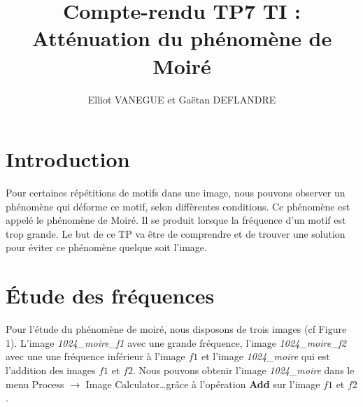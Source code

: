 \documentclass[a4paper,11pt]{article}
\title{Compte-rendu TP7 TI : Atténuation du phénomène de Moiré}
\author{Elliot VANEGUE et Gaëtan DEFLANDRE}
\begin{document}


  \maketitle
  
  \mbox{}
  \newpage
  \clearpage
  
  \section*{Introduction}
  Pour certaines répétitions de motifs dans une image, nous pouvons observer un phénomène qui déforme ce motif, selon diffèrentes conditions. 
  Ce phénomène est appelé le phénomène de Moiré. Il se produit lorsque la fréquence d’un motif est trop grande. Le but de ce TP va être de 
  comprendre et de trouver une solution pour éviter ce phénomène quelque soit l’image.\\
 
  \section{Étude des fréquences}
  Pour l’étude du phénomène de moiré, nous disposons de trois images (cf Figure 1). L’image \textit{1024\_moire\_f1} avec une grande fréquence, 
  l’image \textit{1024\_moire\_f2} avec une une fréquence inférieur à l’image $f1$ et l’image \textit{1024\_moire} qui est l’addition des images 
  $f1$ et $f2$. Nous pouvons obtenir l’image \textit{1024\_moire} dans le menu Process $\rightarrow$ Image Calculator\ldots grâce à l’opération 
  \textbf{Add} sur l’image $f1$ et $f2$.\\
\end{document}
